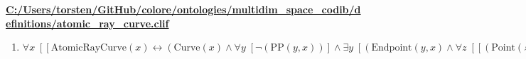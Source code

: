 \documentclass{article}
\begin{document}
\textbf{\url{C:/Users/torsten/GitHub/colore/ontologies/multidim\_space\_codib/definitions/atomic\_ray\_curve.clif}}

\begin{enumerate}
\item $\forall x\;  \left[ \left[ \textrm{AtomicRayCurve}(x) \leftrightarrow \left(\textrm{Curve}(x) \land \forall y\;  \left[ \neg \left(\textrm{PP}(y,x)\right) \right] \land \exists y\;  \left[ \left(\textrm{Endpoint}(y,x) \land \forall z\;  \left[ \left[ \left(\textrm{Point}(z) \land \textrm{Cont}(z,x)\right) \rightarrow \textrm{=}(y,z) \right] \right]\right) \right]\right) \right] \right]$
\end{enumerate}
\end{document}
